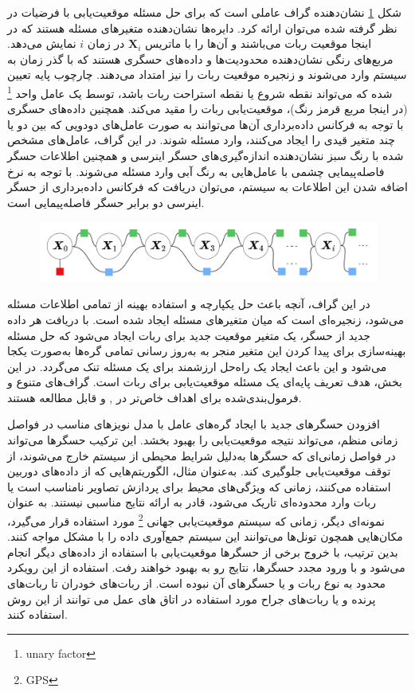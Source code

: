 شکل 
\ref{fig:localization}
نشان‌دهنده گراف عاملی است که برای حل مسئله موقعیت‌یابی با فرضیات در نظر گرفته شده می‌توان ارائه کرد. دایره‌ها نشان‌دهنده متغیرهای مسئله هستند که در اینجا موقعیت ربات می‌باشند و آن‌ها را با ماتریس
$\boldsymbol{X}_i$ 
در زمان $i$ نمایش می‌دهد. مربع‌های رنگی نشان‌دهنده محدودیت‌ها و داده‌های حسگری هستند که با گذر زمان به سیستم وارد می‌شوند و زنجیره موقعیت ربات را نیز امتداد می‌دهند. چارچوب پایه تعیین شده که می‌تواند نقطه شروع یا نقطه استراحت ربات باشد، توسط یک عامل واحد
\footnote{unary factor}
(در اینجا مربع قرمز رنگ)، موقعیت‌یابی ربات را مقید می‌کند. همچنین داده‌های حسگری با توجه به فرکانس داده‌برداری آن‌ها می‌توانند به صورت عامل‌های دودویی که بین دو یا چند متغیر قیدی را ایجاد می‌کنند، وارد مسئله شوند. در این گراف، عامل‌های مشخص شده با رنگ سبز نشان‌دهنده اندازه‌گیری‌های حسگر اینرسی و همچنین اطلاعات حسگر فاصله‌پیمایی چشمی با عامل‌هایی به رنگ آبی وارد مسئله می‌شوند. با توجه به نرخ اضافه شدن این اطلاعات به سیستم، می‌توان دریافت که فرکانس داده‌برداری از حسگر اینرسی دو برابر حسگر فاصله‌پیمایی است. 
\begin{figure}
	\centering
	\includegraphics[width=0.7\linewidth]{img/Localization}
	\caption{}
	\label{fig:localization}
\end{figure}

در این گراف، آنچه باعث حل یکپارچه و استفاده بهینه از تمامی اطلاعات مسئله می‌شود، زنجیره‌ای است که میان متغیرهای مسئله ایجاد شده است. با دریافت هر داده جدید از حسگر، یک متغیر موقعیت جدید برای ربات ایجاد می‌شود که حل مسئله بهینه‌سازی برای پیدا کردن این متغیر منجر به به‌روز رسانی تمامی گره‌ها به‌صورت یکجا می‌شود و این باعث ایجاد یک راه‌حل ارزشمند برای یک مسئله تنک می‌گردد. در این بخش، هدف تعریف پایه‌ای یک مسئله موقعیت‌یابی برای ربات است. گراف‌های متنوع و فرمول‌بندی‌شده برای اهداف خاص‌تر در
\cite{yang2022indoor}, 
\cite{song2021tightly}
و 
\cite{leitinger2017factor}
قابل مطالعه هستند. 

افزودن حسگرهای جدید با ایجاد گره‌های عامل با مدل نویزهای مناسب در فواصل زمانی منظم، می‌تواند نتیجه موقعیت‌یابی را بهبود بخشد. این ترکیب حسگرها می‌تواند در فواصل زمانی‌ای که حسگرها به‌دلیل شرایط محیطی از سیستم خارج می‌شوند، از توقف موقعیت‌یابی جلوگیری کند. به‌عنوان مثال، الگوریتم‌هایی که از داده‌های دوربین استفاده می‌کنند، زمانی که ویژگی‌های محیط برای پردازش تصاویر نامناسب است یا ربات وارد محدوده‌ای تاریک می‌شود، قادر به ارائه نتایج مناسبی نیستند. به عنوان نمونه‌ای دیگر، زمانی که سیستم موقعیت‌یابی جهانی
\footnote{GPS}
مورد استفاده قرار می‌گیرد، مکان‌هایی همچون تونل‌ها می‌توانند این سیستم جمع‌آوری داده را با مشکل مواجه کنند. بدین ترتیب، با خروج برخی از حسگرها موقعیت‌یابی با استفاده از داده‌های دیگر انجام می‌شود و با ورود مجدد حسگرها، نتایج رو به بهبود خواهند رفت. استفاده از این رویکرد محدود به نوع ربات و یا حسگرهای آن نبوده است.  
از ربات‌های خودران
\cite{wilbers2019localization}
تا ربات‌های پرنده
\cite{dai2022uav}
و یا ربات‌های جراح مورد استفاده در اتاق های عمل می توانند از این روش استفاده کنند. 


